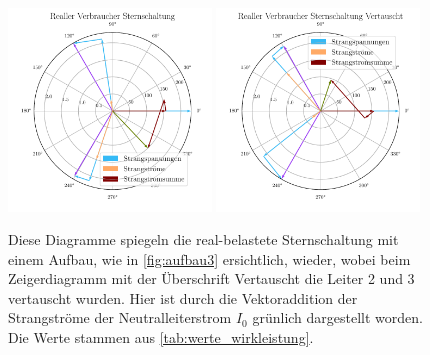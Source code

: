 \documentclass[12pt,english,ngerman]{scrartcl}
\begin{document}
\begin{figure}[H]
	\begin{center}
		\includegraphics[width = 0.48\textwidth]{figures/zeigerSternReal.pdf}
		\includegraphics[width = 0.48\textwidth]{figures/zeigerSternRealVertauscht.pdf}
	\end{center}
	\caption[Zeigerdiagramme einer real-belastete Sternschaltung und dessen vertauschten
		Leiter]{Diese Diagramme spiegeln die real-belastete Sternschaltung mit einem
		Aufbau, wie in \autoref{fig:aufbau3} ersichtlich, wieder, wobei beim
		Zeigerdiagramm mit der Überschrift Vertauscht die Leiter 2 und 3 vertauscht
		wurden. Hier ist durch die Vektoraddition der Strangströme der
		Neutralleiterstrom $I_0$ grünlich dargestellt worden. Die Werte stammen aus
		\autoref{tab:werte_wirkleistung}.
	}\label{fig:zeigerSternReal}
\end{figure}
\end{document}
